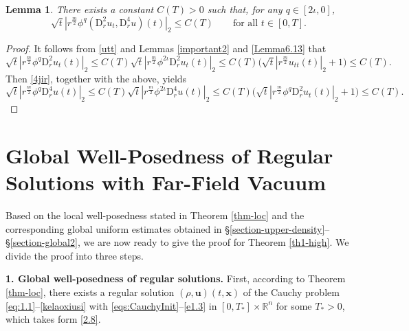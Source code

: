 \documentclass[11pt,reqno]{amsart}
\newtheorem{lem}{Lemma}[section]
\numberwithin{rk}{section}
\numberwithin{prop}{section}
\numberwithin{mydef}{section}
\numberwithin{lem}{section}
\numberwithin{equation}{section}
\numberwithin{thm}{section}
\begin{document}
\begin{lem}\label{Lemma6.14}  
There exists a constant $C(T)>0$ such that, for any $q\in [2\iota,0]$,
\begin{equation*}
\sqrt{t}|r^{\frac{m}{2}}\phi^q(\mathrm{D}_r^2 u_t,\mathrm{D}_r^4 u)(t)|_2\leq C(T)\qquad\text{for all $t\in [0,T]$}.
\end{equation*}
\end{lem}
\begin{proof}
It follows from \eqref{utt} and Lemmas \ref{important2} and \ref{Lemma6.13} that 
\begin{equation*} 
\sqrt{t}|r^{\frac{m}{2}}\phi^q\mathrm{D}_r^2u_t(t)|_2\leq C(T)\sqrt{t}|r^{\frac{m}{2}}\phi^{2\iota}\mathrm{D}_r^2 u_t(t)|_2\leq C(T)\big(\sqrt{t}|r^\frac{m}{2}u_{tt}(t)|_2+1\big)\leq C(T).
\end{equation*}
Then \eqref{4jir}, together with the above, yields
\begin{equation*} 
\sqrt{t} |r^{\frac{m}{2}}\phi^q\mathrm{D}_r^4u(t)|_2\leq C(T)\sqrt{t} |r^{\frac{m}{2}}\phi^{2\iota}\mathrm{D}_r^4u(t)|_2\leq C(T)\big(\sqrt{t} |r^{\frac{m}{2}}\phi^q\mathrm{D}_r^2u_t(t)|_2+1\big)\leq C(T).
\end{equation*}
\end{proof}

\section{Global Well-Posedness of  Regular Solutions with Far-Field Vacuum}\label{se46}
Based on the local well-posedness stated in Theorem \ref{thm-loc} and the corresponding global uniform estimates obtained in \S \ref{section-upper-density}--\S \ref{section-global2}, we are now ready to give the proof for Theorem \ref{th1-high}. We divide the proof into three steps.

\smallskip
\textbf{1. Global well-posedness of regular solutions.} 
First, according to Theorem \ref{thm-loc}, there exists a 
regular solution $(\rho, \boldsymbol{u})(t,\boldsymbol{x})$ of the Cauchy problem \eqref{eq:1.1}--\eqref{kelaoxiusi} with \eqref{eqs:CauchyInit}--\eqref{e1.3} in $[0,T_*]\times \mathbb{R}^n$ for some $T_*>0$, which takes form \eqref{2.8}.
\end{document}
